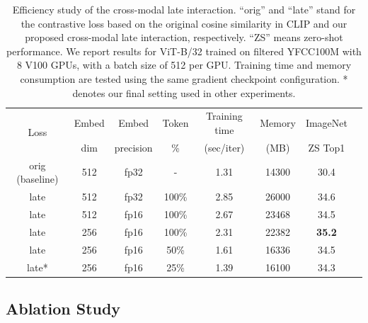 \begin{table}[t!]
\vspace{-3mm}
    \caption{Efficiency study of the cross-modal late interaction. ``orig'' and ``late'' stand for the contrastive loss based on the original cosine similarity 
    in CLIP and our proposed cross-modal late interaction, respectively. ``ZS'' means zero-shot performance.
    We report results for ViT-B/32 trained on filtered YFCC100M with 8 V100 GPUs, with a batch size of 512 per GPU. Training time and memory consumption are tested using the same gradient checkpoint configuration. 
    * denotes our final setting used in other experiments.}
    \label{tab:efficiency-late}
    \begin{center}

    \begin{tabular}{cccccccc}
    \toprule \multirow{2}{*}{ Loss }   &Embed&Embed &  Token  &  Training time   &  Memory  & ImageNet \\
                                     & dim & precision&  \% & (sec/iter)     &  (MB)    & ZS Top1  \\
    \midrule 
    orig (baseline)& 512 & fp32 & - &1.31 & 14300  & 30.4 \\
    late & 512 & fp32 &100\% & 2.85 & 26000 & 34.6 \\
    late & 512 & fp16 &100\% & 2.67 & 23468 & 34.5 \\
    late & 256 & fp16 &100\% & 2.31 & 22382 & \textbf{35.2} \\
    late & 256 & fp16 &50\% & 1.61 & 16336 & 34.5 \\
    late* & 256 & fp16 &25\% & 1.39 & 16100 & 34.3 \\
    
    \bottomrule
    \end{tabular}
    \end{center}
    \vspace{-3mm}
\end{table}

\vspace{-1mm}
\subsection{Ablation Study}
\label{sec:ablation_yfcc}

